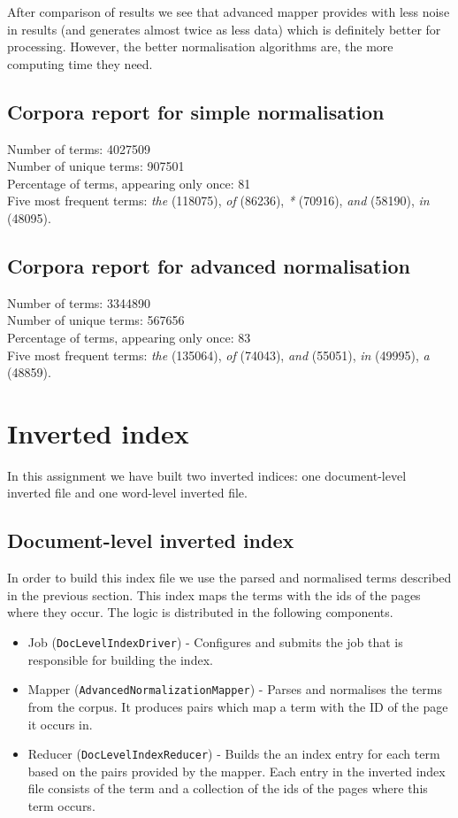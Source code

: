 \documentclass[a4paper, notitlepage]{report}
\begin{document}
After comparison of results we see that advanced mapper provides with less noise in results (and generates almost twice as less data) which is definitely better for processing. However, the better normalisation algorithms are, the more computing time they need.  

\subsection{Corpora report for simple normalisation}

Number of terms: 4027509\\
Number of unique terms: 907501\\
Percentage of terms, appearing only once: 81\\
Five most frequent terms: \emph{the} (118075), \emph{of} (86236), \emph{*} (70916), \emph{and} (58190), \emph{in} (48095).


\subsection{Corpora report for advanced normalisation}

Number of terms: 3344890\\
Number of unique terms: 567656\\
Percentage of terms, appearing only once: 83\\
Five most frequent terms: \emph{the} (135064), \emph{of} (74043), \emph{and} (55051), \emph{in} (49995), \emph{a} (48859).

\section{Inverted index}
In this assignment we have built two inverted indices: one document-level inverted file and one word-level inverted file.

\subsection{Document-level inverted index}
In order to build this index file we use the parsed and normalised terms described in the previous section. This index maps the terms with the ids of the pages where they occur. The logic is distributed in the following components.

\begin{itemize}
	\item Job (\lstinline{DocLevelIndexDriver}) - Configures and submits the job that is responsible for building the index.
	\item Mapper (\lstinline{AdvancedNormalizationMapper}) - Parses and normalises the terms from the corpus. It produces pairs which map a term with the ID of the page it occurs in.
	\item Reducer (\lstinline{DocLevelIndexReducer}) - Builds the an index entry for each term based on the pairs provided by the mapper. Each entry in the inverted index file consists of the term and a collection of the ids of the pages where this term occurs.  
\end{itemize}
\end{document}
